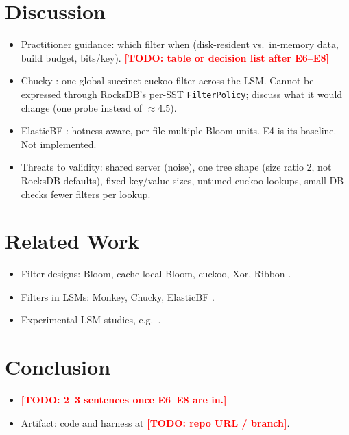 \documentclass[sigconf,nonacm]{acmart}
\newcommand{\todo}[1]{\textcolor{red}{\textbf{[TODO: #1]}}}
\begin{document}

\section{Discussion}
\label{sec:discussion}
\begin{itemize}
  \item Practitioner guidance: which filter when (disk-resident vs.\
    in-memory data, build budget, bits/key). \todo{table or decision list
    after E6--E8}
  \item Chucky \cite{dayan2021chucky}: one global succinct cuckoo filter
    across the LSM. Cannot be expressed through RocksDB's per-SST
    \texttt{FilterPolicy}; discuss what it would change (one probe instead
    of $\approx$4.5).
  \item ElasticBF \cite{li2019elasticbf}: hotness-aware, per-file multiple
    Bloom units. E4 is its baseline. Not implemented.
  \item Threats to validity: shared server (noise), one tree shape (size
    ratio 2, not RocksDB defaults), fixed key/value sizes, untuned cuckoo
    lookups, small DB checks fewer filters per lookup.
\end{itemize}

\section{Related Work}
\label{sec:related}
\begin{itemize}
  \item Filter designs: Bloom, cache-local Bloom, cuckoo, Xor, Ribbon
    \cite{bloom1970,putze2009cacheefficient,fan2014cuckoo,graf2020xor,dillinger2021ribbon}.
  \item Filters in LSMs: Monkey, Chucky, ElasticBF
    \cite{dayan2017monkey,dayan2021chucky,li2019elasticbf}.
  \item Experimental LSM studies, e.g.\ \cite{sarkar2021compaction}.
\end{itemize}

\section{Conclusion}
\label{sec:conclusion}
\begin{itemize}
  \item \todo{2--3 sentences once E6--E8 are in.}
  \item Artifact: code and harness at \todo{repo URL / branch}.
\end{itemize}



\end{document}

